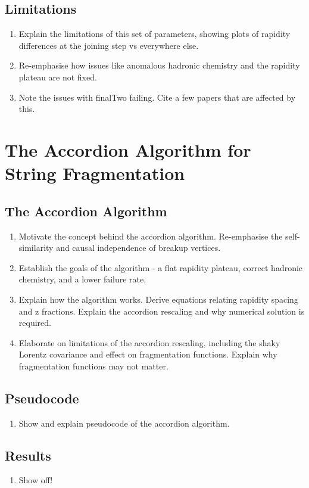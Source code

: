 \documentclass[12pt,a4paper]{report}
\begin{document}
\section{Limitations}
\begin{enumerate}
\item Explain the limitations of this set of parameters, showing plots of rapidity differences at the joining step vs everywhere else.
\item Re-emphasise how issues like anomalous hadronic chemistry and the rapidity plateau are not fixed.
\item Note the issues with finalTwo failing. Cite a few papers that are affected by this.
\end{enumerate}

\chapter{The Accordion Algorithm for String Fragmentation}
\section{The Accordion Algorithm}
\begin{enumerate}
\item Motivate the concept behind the accordion algorithm. Re-emphasise the self-similarity and causal independence of breakup vertices.
\item Establish the goals of the algorithm - a flat rapidity plateau, correct hadronic chemistry, and a lower failure rate.
\item Explain how the algorithm works. Derive equations relating rapidity spacing and z fractions. Explain the accordion rescaling and why numerical solution is required.
\item Elaborate on limitations of the accordion rescaling, including the shaky Lorentz covariance and effect on fragmentation functions. Explain why fragmentation functions may not matter.
\end{enumerate}

\section{Pseudocode}
\begin{enumerate}
\item Show and explain pseudocode of the accordion algorithm.
\end{enumerate}

\section{Results}
\begin{enumerate}
\item Show off!
\end{enumerate}
\end{document}
